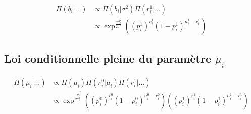\documentclass[
]{article}
\begin{document}
\begin{align*}
\Pi(b_i|...) &\propto \Pi(b_i|\sigma^2) \Pi(r_i^1|...) \\
&\propto \exp^{\frac{-b_i^2}{2\sigma^2}} \left((p_i^1)^{r_i^1}(1-p_i^1)^{n_i^1-r_i^1}\right)
\end{align*}

\hypertarget{loi-conditionnelle-pleine-du-paramuxe8tre-mu_i}{%
\subsection{\texorpdfstring{Loi conditionnelle pleine du paramètre
\(\mu_i\)}{Loi conditionnelle pleine du paramètre \textbackslash mu\_i}}\label{loi-conditionnelle-pleine-du-paramuxe8tre-mu_i}}

\begin{align*}
\Pi(\mu_i|...) &\propto \Pi(\mu_i)\Pi(r_i^0|\mu_i)\Pi(r_i^1|...) \\
&\propto \exp^{\frac{-\mu_i^2}{2\sigma_{\mu}^2}}\left((p_i^0)^{r_i^0}(1-p_i^0)^{n_i^0-r_i^0}\right)\left((p_i^1)^{r_i^1}(1-p_i^1)^{n_i^1-r_i^1}\right)
\end{align*}
\end{document}
